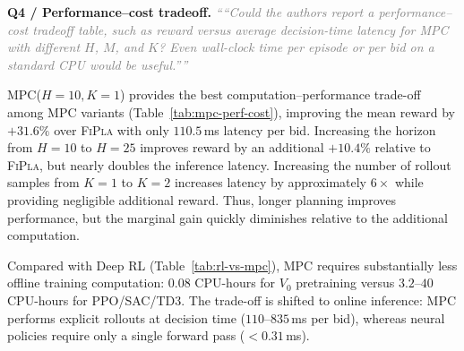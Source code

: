 \documentclass[11pt]{article}
\newcommand{\reviewer}[1]{\textit{\textcolor{gray}{``#1''}}}
\begin{document}

\noindent\textbf{Q4 / Performance--cost tradeoff.}\quad
\reviewer{``Could the authors report a performance--cost tradeoff table, such as
reward versus average decision-time latency for MPC with different $H$, $M$,
and $K$?  Even wall-clock time per episode or per bid on a standard CPU would
be useful.''}

\textsc{MPC}($H{=}10,K{=}1$) provides the best computation--performance
trade-off among MPC variants (Table~\ref{tab:mpc-perf-cost}), improving the mean
reward by $+31.6\%$ over \textsc{FiPla} with only $110.5$\,ms latency per bid.
Increasing the horizon from $H{=}10$ to $H{=}25$ improves reward by an additional
$+10.4\%$ relative to \textsc{FiPla}, but nearly doubles the inference latency.
Increasing the number of rollout samples from $K{=}1$ to $K{=}2$ increases
latency by approximately $6\times$ while providing negligible additional reward.
Thus, longer planning improves performance, but the marginal gain quickly
diminishes relative to the additional computation.

Compared with Deep RL (Table~\ref{tab:rl-vs-mpc}), MPC requires substantially
less offline training computation: $0.08$ CPU-hours for $V_0$ pretraining versus
$3.2$--$40$ CPU-hours for PPO/SAC/TD3. The trade-off is shifted to online
inference: MPC performs explicit rollouts at decision time
($110$--$835$\,ms per bid), whereas neural policies require only a single forward
pass ($<0.31$\,ms).
\end{document}
